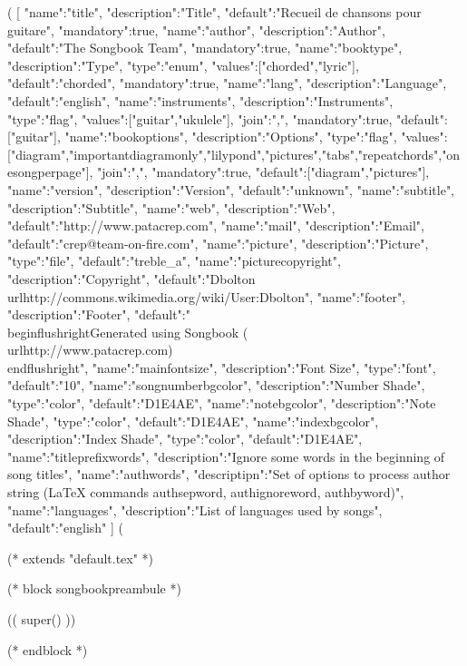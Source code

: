 (%
[
{"name":"title", "description":"Title", "default":"Recueil de chansons pour guitare", "mandatory":true},
{"name":"author", "description":"Author", "default":"The Songbook Team", "mandatory":true},
{"name":"booktype", "description":"Type", "type":"enum", "values":["chorded","lyric"], "default":"chorded", "mandatory":true},
{"name":"lang", "description":"Language", "default":"english"},
{"name":"instruments", "description":"Instruments", "type":"flag", "values":["guitar","ukulele"], "join":",", "mandatory":true, "default":["guitar"]},
{"name":"bookoptions", "description":"Options", "type":"flag", "values":["diagram","importantdiagramonly","lilypond","pictures","tabs","repeatchords","onesongperpage"], "join":",", "mandatory":true, "default":["diagram","pictures"]},
{"name":"version", "description":"Version", "default":"unknown"},
{"name":"subtitle", "description":"Subtitle"},
{"name":"web", "description":"Web", "default":"http://www.patacrep.com"},
{"name":"mail", "description":"Email", "default":"crep@team-on-fire.com"},
{"name":"picture", "description":"Picture", "type":"file", "default":"treble_a"},
{"name":"picturecopyright", "description":"Copyright", "default":"Dbolton \\url{http://commons.wikimedia.org/wiki/User:Dbolton}"},
{"name":"footer", "description":"Footer", "default":"\\begin{flushright}Generated using Songbook (\\url{http://www.patacrep.com})\\end{flushright}"},
{"name":"mainfontsize", "description":"Font Size", "type":"font", "default":"10"},
{"name":"songnumberbgcolor", "description":"Number Shade", "type":"color", "default":"D1E4AE"},
{"name":"notebgcolor", "description":"Note Shade", "type":"color", "default":"D1E4AE"},
{"name":"indexbgcolor", "description":"Index Shade", "type":"color", "default":"D1E4AE"},
{"name":"titleprefixwords", "description":"Ignore some words in the beginning of song titles"},
{"name":"authwords", "descriptipn":"Set of options to process author string (LaTeX commands authsepword, authignoreword, authbyword)"},
{"name":"languages", "description":"List of languages used by songs", "default":"english"}
]
(%

(* extends "default.tex" *)

(* block songbookpreambule *)
   \usepackage[
     a4paper %
     ,includeheadfoot %
     ,hmarginratio=1:1 %
     ,outer=1.8cm %
     ,vmarginratio=1:1 %
     ,bmargin=1.3cm %
     ]{geometry}

  (( super() ))

   \pagestyle{empty}


   \renewcommand{\snumbgcolor}{SongNumberBgColor}
   \renewcommand{\notebgcolor}{NoteBgColor}
   \renewcommand{\idxbgcolor}{IndexBgColor}
(* endblock *)
